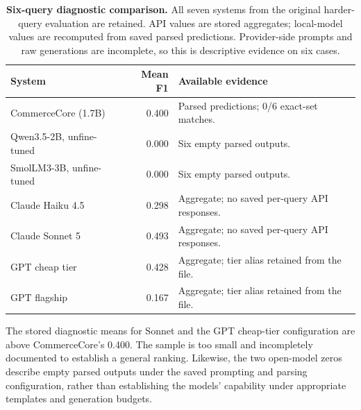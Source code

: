 \begin{table}[htbp]
\centering\small
\caption{\textbf{Six-query diagnostic comparison.} All seven systems from the original harder-query evaluation are retained. API values are stored aggregates; local-model values are recomputed from saved parsed predictions. Provider-side prompts and raw generations are incomplete, so this is descriptive evidence on six cases.}
\label{tab:diagnostic-benchmark}
\begin{tabularx}{\linewidth}{@{}lr>{\raggedright\arraybackslash}X@{}}
\toprule
System & Mean F1 & Available evidence \\
\midrule
CommerceCore (1.7B) & 0.400 & Parsed predictions; 0/6 exact-set matches. \\
Qwen3.5-2B, unfine-tuned & 0.000 & Six empty parsed outputs. \\
SmolLM3-3B, unfine-tuned & 0.000 & Six empty parsed outputs. \\
\midrule
Claude Haiku 4.5 & 0.298 & Aggregate; no saved per-query API responses. \\
Claude Sonnet 5 & 0.493 & Aggregate; no saved per-query API responses. \\
GPT cheap tier & 0.428 & Aggregate; tier alias retained from the file. \\
GPT flagship & 0.167 & Aggregate; tier alias retained from the file. \\
\bottomrule
\end{tabularx}
\end{table}

The stored diagnostic means for Sonnet and the GPT cheap-tier configuration are above CommerceCore's 0.400. The sample is too small and incompletely documented to establish a general ranking. Likewise, the two open-model zeros describe empty parsed outputs under the saved prompting and parsing configuration, rather than establishing the models' capability under appropriate templates and generation budgets.
